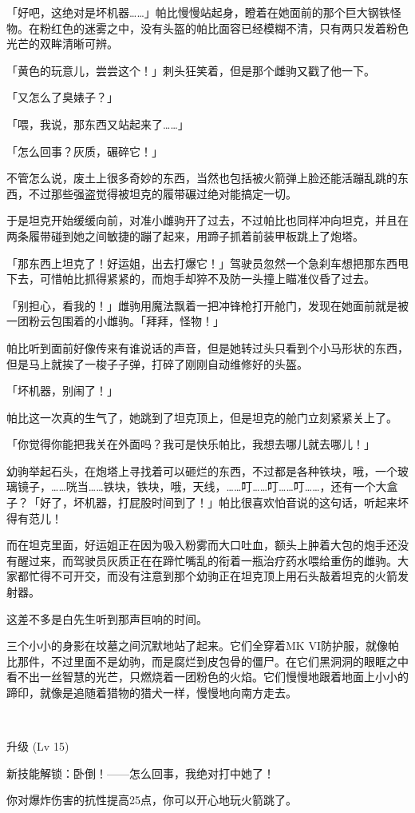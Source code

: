 「好吧，这绝对是坏机器……」帕比慢慢站起身，瞪着在她面前的那个巨大钢铁怪物。在粉红色的迷雾之中，没有头盔的帕比面容已经模糊不清，只有两只发着粉色光芒的双眸清晰可辨。

「黄色的玩意儿，尝尝这个！」刺头狂笑着，但是那个雌驹又戳了他一下。

「又怎么了臭婊子？」

「喂，我说，那东西又站起来了……」

「怎么回事？灰质，碾碎它！」

不管怎么说，废土上很多奇妙的东西，当然也包括被火箭弹上脸还能活蹦乱跳的东西，不过那些强盗觉得被坦克的履带碾过绝对能搞定一切。

于是坦克开始缓缓向前，对准小雌驹开了过去，不过帕比也同样冲向坦克，并且在两条履带碰到她之间敏捷的蹦了起来，用蹄子抓着前装甲板跳上了炮塔。

「那东西上坦克了！好运姐，出去打爆它！」驾驶员忽然一个急刹车想把那东西甩下去，可惜帕比抓得紧紧的，而炮手却猝不及防一头撞上瞄准仪昏了过去。

「别担心，看我的！」雌驹用魔法飘着一把冲锋枪打开舱门，发现在她面前就是被一团粉云包围着的小雌驹。「拜拜，怪物！」

帕比听到面前好像传来有谁说话的声音，但是她转过头只看到个小马形状的东西，但是马上就挨了一梭子子弹，打碎了刚刚自动维修好的头盔。

「坏机器，别闹了！」

帕比这一次真的生气了，她跳到了坦克顶上，但是坦克的舱门立刻紧紧关上了。

「你觉得你能把我关在外面吗？我可是快乐帕比，我想去哪儿就去哪儿！」

幼驹举起石头，在炮塔上寻找着可以砸烂的东西，不过都是各种铁块，哦，一个玻璃镜子，……咣当……铁块，铁块，哦，天线，……叮……叮……叮……，还有一个大盒子？「好了，坏机器，打屁股时间到了！」帕比很喜欢怕音说的这句话，听起来坏得有范儿！

而在坦克里面，好运姐正在因为吸入粉雾而大口吐血，额头上肿着大包的炮手还没有醒过来，而驾驶员灰质正在在蹄忙嘴乱的衔着一瓶治疗药水喂给重伤的雌驹。大家都忙得不可开交，而没有注意到那个幼驹正在坦克顶上用石头敲着坦克的火箭发射器。

这差不多是白先生听到那声巨响的时间。

\horizonline


三个小小的身影在坟墓之间沉默地站了起来。它们全穿着MK VI防护服，就像帕比那件，不过里面不是幼驹，而是腐烂到皮包骨的僵尸。在它们黑洞洞的眼眶之中看不出一丝智慧的光芒，只燃烧着一团粉色的火焰。它们慢慢地跟着地面上小小的蹄印，就像是追随着猎物的猎犬一样，慢慢地向南方走去。

\clearpage

~\vfill

\begin{note}
    升级 (Lv 15) 

    新技能解锁：卧倒！——怎么回事，我绝对打中她了！

    你对爆炸伤害的抗性提高25点，你可以开心地玩火箭跳了。
\end{note}


